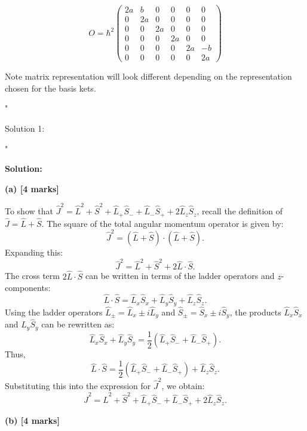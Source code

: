 \[ 
O = \hbar^2 \begin{pmatrix} 2a & b & 0 & 0 & 0 & 0\\ 0 & 2a & 0 & 0 & 0 & 0\\ 0 & 0 & 2a & 0 & 0 & 0\\ 0 & 0 & 0 & 2a & 0 & 0\\ 0 & 0 & 0 & 0 & 2a & -b\\ 0 & 0 & 0 & 0 & 0 & 2a \end{pmatrix}
\]

Note matrix representation will look different depending on the representation chosen for the basis kets. 

"

Solution 1: 

"

\textbf{Solution:}  

\textbf{(a) [4 marks]}  

To show that $\hat{J}^2 = \hat{L}^2 + \hat{S}^2 + \hat{L}_+ \hat{S}_- + \hat{L}_- \hat{S}_+ + 2 \hat{L}_z \hat{S}_z$, recall the definition of $\hat{J} = \hat{L} + \hat{S}$. The square of the total angular momentum operator is given by:  
\[
\hat{J}^2 = (\hat{L} + \hat{S}) \cdot (\hat{L} + \hat{S}).
\]  
Expanding this:  
\[
\hat{J}^2 = \hat{L}^2 + \hat{S}^2 + 2 \hat{L} \cdot \hat{S}.
\]  
The cross term $2 \hat{L} \cdot \hat{S}$ can be written in terms of the ladder operators and $z$-components:  
\[
\hat{L} \cdot \hat{S} = \hat{L}_x \hat{S}_x + \hat{L}_y \hat{S}_y + \hat{L}_z \hat{S}_z.
\]  
Using the ladder operators $\hat{L}_\pm = \hat{L}_x \pm i \hat{L}_y$ and $\hat{S}_\pm = \hat{S}_x \pm i \hat{S}_y$, the products $\hat{L}_x \hat{S}_x$ and $\hat{L}_y \hat{S}_y$ can be rewritten as:  
\[
\hat{L}_x \hat{S}_x + \hat{L}_y \hat{S}_y = \frac{1}{2} \left( \hat{L}_+ \hat{S}_- + \hat{L}_- \hat{S}_+ \right).
\]  
Thus,  
\[
\hat{L} \cdot \hat{S} = \frac{1}{2} \left( \hat{L}_+ \hat{S}_- + \hat{L}_- \hat{S}_+ \right) + \hat{L}_z \hat{S}_z.
\]  
Substituting this into the expression for $\hat{J}^2$, we obtain:  
\[
\hat{J}^2 = \hat{L}^2 + \hat{S}^2 + \hat{L}_+ \hat{S}_- + \hat{L}_- \hat{S}_+ + 2 \hat{L}_z \hat{S}_z.
\]  

\textbf{(b) [4 marks]}  

